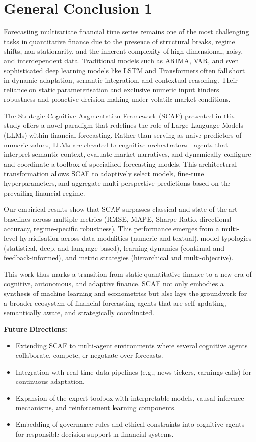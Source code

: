 \documentclass[conference]{IEEEtran}
\begin{document}
\section{General Conclusion 1}

Forecasting multivariate financial time series remains one of the most challenging tasks in quantitative finance due to the presence of structural breaks, regime shifts, non-stationarity, and the inherent complexity of high-dimensional, noisy, and interdependent data. Traditional models such as ARIMA, VAR, and even sophisticated deep learning models like LSTM and Transformers often fall short in dynamic adaptation, semantic integration, and contextual reasoning. Their reliance on static parameterisation and exclusive numeric input hinders robustness and proactive decision-making under volatile market conditions.

The Strategic Cognitive Augmentation Framework (SCAF) presented in this study offers a novel paradigm that redefines the role of Large Language Models (LLMs) within financial forecasting. Rather than serving as naive predictors of numeric values, LLMs are elevated to cognitive orchestrators—agents that interpret semantic context, evaluate market narratives, and dynamically configure and coordinate a toolbox of specialised forecasting models. This architectural transformation allows SCAF to adaptively select models, fine-tune hyperparameters, and aggregate multi-perspective predictions based on the prevailing financial regime.

Our empirical results show that SCAF surpasses classical and state-of-the-art baselines across multiple metrics (RMSE, MAPE, Sharpe Ratio, directional accuracy, regime-specific robustness). This performance emerges from a multi-level hybridisation across data modalities (numeric and textual), model typologies (statistical, deep, and language-based), learning dynamics (continual and feedback-informed), and metric strategies (hierarchical and multi-objective).

This work thus marks a transition from static quantitative finance to a new era of cognitive, autonomous, and adaptive finance. SCAF not only embodies a synthesis of machine learning and econometrics but also lays the groundwork for a broader ecosystem of financial forecasting agents that are self-updating, semantically aware, and strategically coordinated.

\textbf{Future Directions:}
\begin{itemize}
    \item Extending SCAF to multi-agent environments where several cognitive agents collaborate, compete, or negotiate over forecasts.
    \item Integration with real-time data pipelines (e.g., news tickers, earnings calls) for continuous adaptation.
    \item Expansion of the expert toolbox with interpretable models, causal inference mechanisms, and reinforcement learning components.
    \item Embedding of governance rules and ethical constraints into cognitive agents for responsible decision support in financial systems.
\end{itemize}
\end{document}
